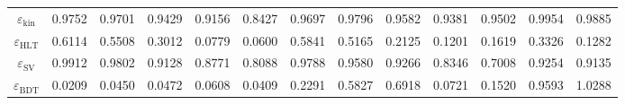 \documentclass[10pt,a4paper]{article}
\begin{document}
\begin{landscape}
{\begin{tabular}{c|cccc|cccc|cccc}
\midrule
$\varepsilon_{\mathrm{kin}}$ & 0.9752 & 0.9701 & 0.9429 & 0.9156 & 0.8427 & 0.9697 & 0.9796 & 0.9582 & 0.9381 & 0.9502 & 0.9954 & 0.9885\\
$\varepsilon_{\mathrm{HLT}}$ & 0.6114 & 0.5508 & 0.3012 & 0.0779 & 0.0600 & 0.5841 & 0.5165 & 0.2125 & 0.1201 & 0.1619 & 0.3326 & 0.1282\\
$\varepsilon_{\mathrm{SV}}$ & 0.9912 & 0.9802 & 0.9128 & 0.8771 & 0.8088 & 0.9788 & 0.9580 & 0.9266 & 0.8346 & 0.7008 & 0.9254 & 0.9135\\
$\varepsilon_{\mathrm{BDT}}$ & 0.0209 & 0.0450 & 0.0472 & 0.0608 & 0.0409 & 0.2291 & 0.5827 & 0.6918 & 0.0721 & 0.1520 & 0.9593 & 1.0288\\
\bottomrule
\end{tabular}}

\end{landscape}
\clearpage
\end{document}
